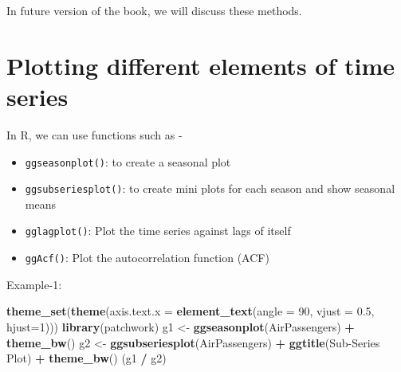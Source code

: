 \documentclass[
]{book}
\newenvironment{Shaded}{\begin{snugshade}}{\end{snugshade}}
\newcommand{\AttributeTok}[1]{\textcolor[rgb]{0.13,0.29,0.53}{#1}}
\newcommand{\DecValTok}[1]{\textcolor[rgb]{0.00,0.00,0.81}{#1}}
\newcommand{\FloatTok}[1]{\textcolor[rgb]{0.00,0.00,0.81}{#1}}
\newcommand{\FunctionTok}[1]{\textcolor[rgb]{0.13,0.29,0.53}{\textbf{#1}}}
\newcommand{\NormalTok}[1]{#1}
\newcommand{\OtherTok}[1]{\textcolor[rgb]{0.56,0.35,0.01}{#1}}
\newcommand{\SpecialCharTok}[1]{\textcolor[rgb]{0.81,0.36,0.00}{\textbf{#1}}}
\newcommand{\StringTok}[1]{\textcolor[rgb]{0.31,0.60,0.02}{#1}}
\providecommand{\tightlist}{%
  \setlength{\itemsep}{0pt}\setlength{\parskip}{0pt}}
\begin{document}
In future version of the book, we will discuss these methods.

\hypertarget{plotting-different-elements-of-time-series}{%
\section{Plotting different elements of time series}\label{plotting-different-elements-of-time-series}}

In R, we can use functions such as -

\begin{itemize}
\tightlist
\item
  \texttt{ggseasonplot()}: to create a seasonal plot
\item
  \texttt{ggsubseriesplot()}: to create mini plots for each season and show seasonal means
\item
  \texttt{gglagplot()}: Plot the time series against lags of itself
\item
  \texttt{ggAcf()}: Plot the autocorrelation function (ACF)
\end{itemize}

Example-1:

\begin{Shaded}
\begin{Highlighting}[]
\FunctionTok{theme\_set}\NormalTok{(}\FunctionTok{theme}\NormalTok{(}\AttributeTok{axis.text.x =} \FunctionTok{element\_text}\NormalTok{(}\AttributeTok{angle =} \DecValTok{90}\NormalTok{, }
                                           \AttributeTok{vjust =} \FloatTok{0.5}\NormalTok{, }
                                           \AttributeTok{hjust=}\DecValTok{1}\NormalTok{)))}
\FunctionTok{library}\NormalTok{(patchwork)}
\NormalTok{g1 }\OtherTok{\textless{}{-}} \FunctionTok{ggseasonplot}\NormalTok{(AirPassengers) }\SpecialCharTok{+}
  \FunctionTok{theme\_bw}\NormalTok{()}
\NormalTok{g2 }\OtherTok{\textless{}{-}} \FunctionTok{ggsubseriesplot}\NormalTok{(AirPassengers) }\SpecialCharTok{+}
  \FunctionTok{ggtitle}\NormalTok{(}\StringTok{\textquotesingle{}Sub{-}Series Plot\textquotesingle{}}\NormalTok{) }\SpecialCharTok{+}
  \FunctionTok{theme\_bw}\NormalTok{()}
\NormalTok{(g1 }\SpecialCharTok{/}\NormalTok{ g2)}
\end{Highlighting}
\end{Shaded}
\end{document}
